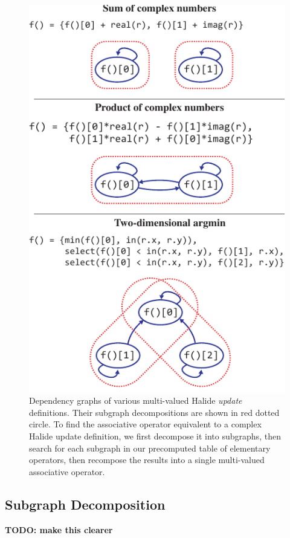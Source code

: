 \begin{figure}[tb]
\centering
\includegraphics{subgraphs}
\caption{Dependency graphs of various multi-valued Halide \emph{update} definitions. Their subgraph decompositions are shown in red dotted circle. To find the associative operator equivalent to a complex Halide update definition, we first decompose it into subgraphs, then search for each subgraph in our precomputed table of elementary operators, then recompose the results into a single multi-valued associative operator.}
\label{fig:subgraphs}
\end{figure}

\subsection{Subgraph Decomposition}
\label{subsec:decomposition}

\textbf{TODO: make this clearer}

